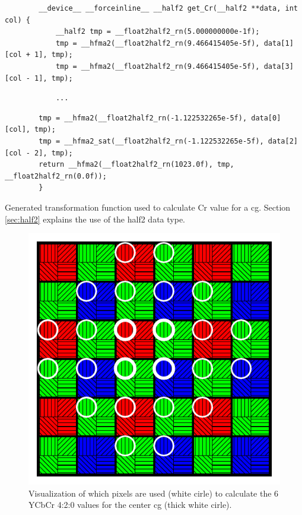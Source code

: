 \begin{listing}[H]
    \begin{verbatim}
        __device__ __forceinline__ __half2 get_Cr(__half2 **data, int col) {
            __half2 tmp = __float2half2_rn(5.000000000e-1f);
            tmp = __hfma2(__float2half2_rn(9.466415405e-5f), data[1][col + 1], tmp);
            tmp = __hfma2(__float2half2_rn(9.466415405e-5f), data[3][col - 1], tmp);
        \end{verbatim}
    \vspace{-28pt}
    \begin{verbatim}
            ...
    \end{verbatim}
    \vspace{-28pt}
    \begin{verbatim}
        tmp = __hfma2(__float2half2_rn(-1.122532265e-5f), data[0][col], tmp);
        tmp = __hfma2_sat(__float2half2_rn(-1.122532265e-5f), data[2][col - 2], tmp);
        return __hfma2(__float2half2_rn(1023.0f), tmp, __float2half2_rn(0.0f));
        }
    \end{verbatim}
    \caption{Generated transformation function used to calculate Cr value for a \gls{cg}.
        Section \ref{sec:half2} explains the use of the \gls{half2} data type.}
    \label{listing:generated_function}
\end{listing}
\begin{figure}[H]
    \centering
    \includegraphics[width=.4\textwidth]{figures/polarized_image/normal_conv.pdf}
    \caption{Visualization of which pixels are used (white cirle) to calculate the 6 YCbCr 4:2:0 values for the center \gls{cg} (thick white cirle).}
    \label{fig:transformation}
\end{figure}